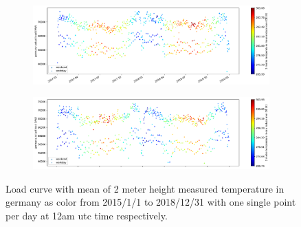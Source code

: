 
\begin{figure}[h!]%
	\centering
	\begin{subfigure}{.5\textwidth}
		\centering
		\includegraphics[width=2.9\textwidth,angle=-90,origin=c]{plots/plot_load_time_func/t2m_mean_18A5_2017010112_2018123112_24F}%
		\label{fig:t2m_mean_18A5_2017010112_2018123112_24F}%
	\end{subfigure}%
	\begin{subfigure}{.5\textwidth}
		\centering
		\includegraphics[width=2.9\textwidth,angle=-90,origin=c]{plots/plot_load_time_func/t2m_mean_18A5_2015010112_2016123112_24F}%
		\label{fig:t2m_mean_18A5_2015010112_2016123112_24F}%
	\end{subfigure}
	\caption{Load curve with mean of 2 meter height measured temperature in germany as color from 2015/1/1 to 2018/12/31 with one single point per day at 12am utc time respectively.}
	\label{fig:t2m_mean_18A5_twofold_24F}
\end{figure}





